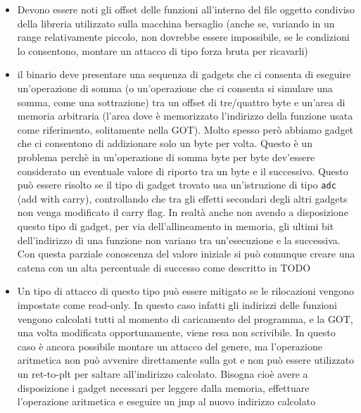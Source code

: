 \begin{itemize}

  \item Devono essere noti gli offset delle funzioni all'interno del
    file oggetto condiviso della libreria utilizzato sulla macchina
    bersaglio (anche se, variando in un range relativamente piccolo,
    non dovrebbe essere impossibile, se le condizioni lo consentono,
    montare un attacco di tipo forza bruta per ricavarli)

  \item il binario deve presentare una sequenza di gadgets che ci
    consenta di eseguire un'operazione di somma (o un'operazione che
    ci consenta si simulare una somma, come una sottrazione) tra un
    offset di tre/quattro byte e un'area di memoria arbitraria (l'area
    dove è memorizzato l'indirizzo della funzione usata come
    riferimento, solitamente nella GOT). Molto spesso però abbiamo
    gadget che ci consentono di addizionare solo un byte per
    volta. Questo è un problema perchè in un'operazione di somma byte
    per byte dev'essere considerato un eventuale valore di riporto tra
    un byte e il successivo. Questo può essere risolto se il tipo di
    gadget trovato usa un'istruzione di tipo \lstinline{adc} (add with
    carry), controllando che tra gli effetti secondari degli altri
    gadgets non venga modificato il carry flag. In realtà anche non
    avendo a disposizione questo tipo di gadget, per via
    dell'allineamento in memoria, gli ultimi bit dell'indirizzo di una
    funzione non variano tra un'esecuzione e la successiva. Con
    questa parziale conoscenza del valore iniziale si può comunque
    creare una catena con un alta percentuale di successo come
    descritto in TODO

  \item Un tipo di attacco di questo tipo può essere mitigato se le
    rilocazioni vengono impostate come read-only. In questo caso
    infatti gli indirizzi delle funzioni vengono calcolati tutti al
    momento di caricamento del programma, e la GOT, una volta
    modificata opportunamente, viene resa non scrivibile. In questo
    caso è ancora possibile montare un attacco del genere, ma
    l'operazione aritmetica non può avvenire direttamente sulla got e
    non può essere utilizzato un ret-to-plt per saltare all'indirizzo
    calcolato. Bisogna cioè avere a disposizione i gadget necessari
    per leggere dalla memoria, effettuare l'operazione aritmetica e
    eseguire un jmp al nuovo indirizzo calcolato

\end{itemize}

